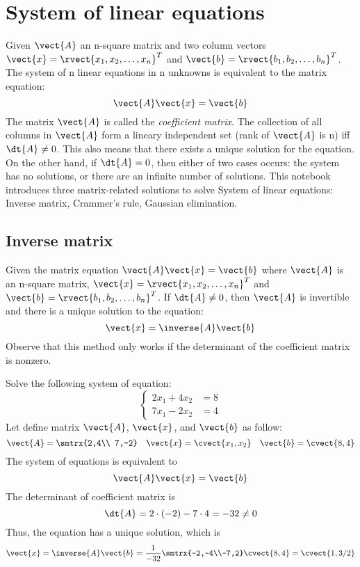 \section{System of linear equations}
\label{linear-eq}
Given $\vect{A}$ an n-square matrix and two column vectors $\vect{x}=\rvect{x_1,x_2,\ldots ,x_n}^T$ and $\vect{b}=\rvect{b_1,b_2,\ldots ,b_n}^T$. The system of n linear equations in n unknowns is equivalent to the matrix equation: \[ \vect{A}\vect{x}=\vect{b} \]
The matrix $\vect{A}$ is called the \emph{coefficient matrix}. The collection of all columns in $\vect{A}$ form a lineary independent set (rank of $\vect{A}$ is n) iff $\dt{A}\neq 0$. This also means that there exists a unique solution for the equation. On the other hand, if $\dt{A}=0$, then either of two cases occurs: the system has no solutions, or there are an infinite number of solutions. This notebook introduces three matrix-related solutions to solve System of linear equations: Inverse matrix, Crammer's rule, Gaussian elimination.
\subsection{Inverse matrix}
Given the matrix equation $\vect{A}\vect{x}=\vect{b}$ where $\vect{A}$ is an n-square matrix, $\vect{x}=\rvect{x_1,x_2,\ldots ,x_n}^T$ and $\vect{b}=\rvect{b_1,b_2,\ldots ,b_n}^T$. If  $\dt{A}\neq 0$, then $\vect{A}$ is invertible and there is a unique solution to the equation: \[ \vect{x}=\inverse{A}\vect{b} \]
Observe that this method only works if the determinant of the coefficient matrix is nonzero.
\begin{example}
Solve the following system of equation:
\begin{equation}
\begin{cases}
    2x_1+4x_2 &= 8 \\
    7x_1-2x_2 &= 4
\end{cases}
\label{apple}
\end{equation}
Let define matrix $\vect{A}$, $\vect{x}$, and $\vect{b}$ as follow:
\[ \vect{A}=\smtrx{2,4\\ 7,-2} \quad \vect{x}=\cvect{x_1,x_2} \quad \vect{b}=\cvect{8,4} \]
The system of equations is equivalent to 
\begin{equation*}
\vect{A}\vect{x}=\vect{b}
\end{equation*}
The determinant of coefficient matrix is \[ \dt{A}=2\cdot (-2) - 7\cdot 4= -32 \neq 0 \] Thus, the equation has a unique solution, which is
\[ \vect{x}=\inverse{A}\vect{b}=\frac{1}{-32} \smtrx{-2,-4\\-7,2}\cvect{8,4}=\cvect{1,3/2} \]
\end{example}
